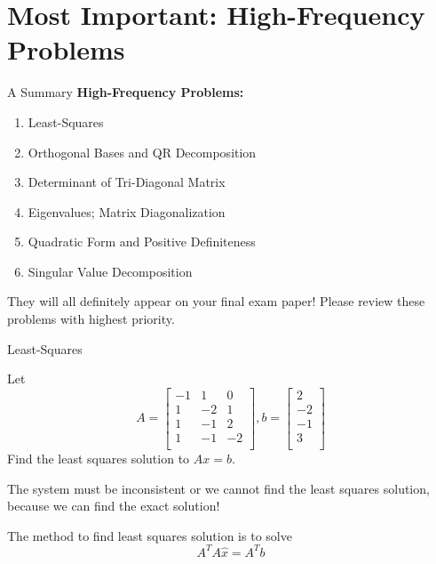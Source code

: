 \documentclass{beamer}
\begin{document}
\section{Most Important: High-Frequency Problems}
\begin{frame}{A Summary}
    \textbf{High-Frequency Problems:}
    \begin{enumerate}
        \item Least-Squares
        \item Orthogonal Bases and QR Decomposition
        \item Determinant of Tri-Diagonal Matrix
        \item Eigenvalues; Matrix Diagonalization
        \item Quadratic Form and Positive Definiteness
        \item Singular Value Decomposition
    \end{enumerate}

    They will all definitely appear on your final exam paper! Please review these problems with highest priority.
\end{frame}
\begin{frame}{Least-Squares}
\begin{example}
Let
\begin{equation*}
    A=\left[ \begin{matrix}
        -1&		1&		0\\
        1&		-2&		1\\
        1&		-1&		2\\
        1&		-1&		-2\\
    \end{matrix} \right] , b=\left[ \begin{array}{c}
        2\\
        -2\\
        -1\\
        3\\
    \end{array} \right]
\end{equation*}
Find the least squares solution to $Ax=b$.
\end{example}

The system must be inconsistent or we cannot find the least squares solution, because we can find the exact solution!

The method to find least squares solution is to solve
\begin{equation*}
    A^TA\hat{x}=A^Tb
\end{equation*}
\end{frame}
\end{document}
